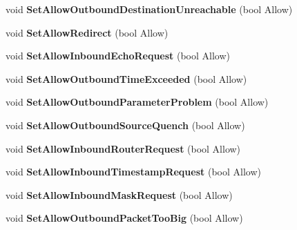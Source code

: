 \begin{DoxyCompactItemize}
\item 
\hypertarget{classcl_fw_profile_a79559748de25cba0ed8afb39f5c7eac4}{
void {\bfseries SetAllowOutboundDestinationUnreachable} (bool Allow)}
\label{classcl_fw_profile_a79559748de25cba0ed8afb39f5c7eac4}

\item 
\hypertarget{classcl_fw_profile_a39ffe68658a2a81df187d44a183c658e}{
void {\bfseries SetAllowRedirect} (bool Allow)}
\label{classcl_fw_profile_a39ffe68658a2a81df187d44a183c658e}

\item 
\hypertarget{classcl_fw_profile_a1d9ae58b641a562d69d59740f0c30faf}{
void {\bfseries SetAllowInboundEchoRequest} (bool Allow)}
\label{classcl_fw_profile_a1d9ae58b641a562d69d59740f0c30faf}

\item 
\hypertarget{classcl_fw_profile_a263ee802f3041a3687ce254589e532c9}{
void {\bfseries SetAllowOutboundTimeExceeded} (bool Allow)}
\label{classcl_fw_profile_a263ee802f3041a3687ce254589e532c9}

\item 
\hypertarget{classcl_fw_profile_af040b8c69e7eb95dbdc59a1bedb628ad}{
void {\bfseries SetAllowOutboundParameterProblem} (bool Allow)}
\label{classcl_fw_profile_af040b8c69e7eb95dbdc59a1bedb628ad}

\item 
\hypertarget{classcl_fw_profile_abbd937c3fc06f0625e997bd77b830d36}{
void {\bfseries SetAllowOutboundSourceQuench} (bool Allow)}
\label{classcl_fw_profile_abbd937c3fc06f0625e997bd77b830d36}

\item 
\hypertarget{classcl_fw_profile_a19d032b8bb79663abdf1e96a568abeaf}{
void {\bfseries SetAllowInboundRouterRequest} (bool Allow)}
\label{classcl_fw_profile_a19d032b8bb79663abdf1e96a568abeaf}

\item 
\hypertarget{classcl_fw_profile_a534e440a9bf8b9b8f6d1455d4f241694}{
void {\bfseries SetAllowInboundTimestampRequest} (bool Allow)}
\label{classcl_fw_profile_a534e440a9bf8b9b8f6d1455d4f241694}

\item 
\hypertarget{classcl_fw_profile_a4c15e0c80d7a1d6dd08153edb613ffda}{
void {\bfseries SetAllowInboundMaskRequest} (bool Allow)}
\label{classcl_fw_profile_a4c15e0c80d7a1d6dd08153edb613ffda}

\item 
\hypertarget{classcl_fw_profile_ad2d1bbe46f36528cb01460b2cd85ec6b}{
void {\bfseries SetAllowOutboundPacketTooBig} (bool Allow)}
\label{classcl_fw_profile_ad2d1bbe46f36528cb01460b2cd85ec6b}


\end{DoxyCompactItemize}
